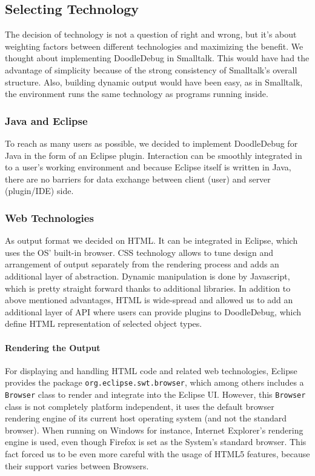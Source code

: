 \documentclass[english]{acm_proc_article-sp}
\begin{document}
\subsection{Selecting Technology}
The decision of technology is not a question of right and wrong, but it's about weighting factors between different technologies and maximizing the benefit. We thought about implementing DoodleDebug in Smalltalk. This would have had the advantage of simplicity because of the strong consistency of Smalltalk's overall structure. Also, building dynamic output would have been easy, as in Smalltalk, the environment runs the same technology as programs running inside.

\subsubsection{Java and Eclipse}
To reach as many users as possible, we decided to implement DoodleDebug for Java in the form of an Eclipse plugin. Interaction can be smoothly integrated in to a user's working environment and because Eclipse itself is written in Java, there are no barriers for data exchange between client (user) and server (plugin/IDE) side.

\subsubsection{Web Technologies}
As output format we decided on HTML. It can be integrated in Eclipse, which uses the OS' built-in browser. CSS technology allows to tune design and arrangement of output separately from the rendering process and adds an additional layer of abstraction. Dynamic manipulation is done by Javascript, which is pretty straight forward thanks to additional libraries. In addition to above mentioned advantages, HTML is wide-spread and allowed us to add an additional layer of API where users can provide plugins to DoodleDebug, which define HTML representation of selected object types.

\paragraph{Rendering the Output}
For displaying and handling HTML code and related web technologies, Eclipse provides the package \verb-org.eclipse.swt.browser-, which among others includes a \verb.Browser. class to render and integrate into the Eclipse UI. However, this \verb.Browser. class is not completely platform independent, it uses the default browser rendering engine of its current host operating system (and not the standard browser). When running on Windows for instance, Internet Explorer's rendering engine is used, even though Firefox is set as the System's standard browser. This fact forced us to be even more careful with the usage of HTML5 features, because their support varies between Browsers.
\end{document}
